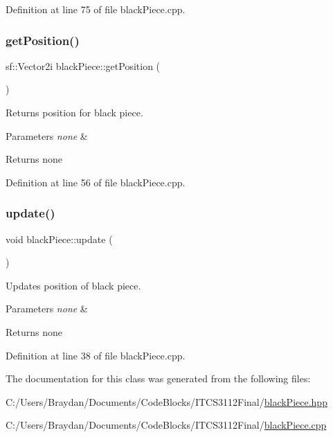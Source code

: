 Definition at line 75 of file black\+Piece.\+cpp.

\mbox{\label{classblack_piece_aba875884346491615e27d4c5111b46a1}} 
\subsubsection{\texorpdfstring{getPosition()}{getPosition()}}
{\footnotesize\ttfamily sf\+::\+Vector2i black\+Piece\+::get\+Position (\begin{DoxyParamCaption}{ }\end{DoxyParamCaption})}

Returns position for black piece.


\begin{DoxyParams}{Parameters}
{\em none} & \\
\hline
\end{DoxyParams}
\begin{DoxyReturn}{Returns}
none 
\end{DoxyReturn}


Definition at line 56 of file black\+Piece.\+cpp.

\mbox{\label{classblack_piece_a8ab322b89affd828b413b3fee35827fa}} 
\subsubsection{\texorpdfstring{update()}{update()}}
{\footnotesize\ttfamily void black\+Piece\+::update (\begin{DoxyParamCaption}{ }\end{DoxyParamCaption})}

Updates position of black piece.


\begin{DoxyParams}{Parameters}
{\em none} & \\
\hline
\end{DoxyParams}
\begin{DoxyReturn}{Returns}
none 
\end{DoxyReturn}


Definition at line 38 of file black\+Piece.\+cpp.



The documentation for this class was generated from the following files\+:\begin{DoxyCompactItemize}
\item 
C\+:/\+Users/\+Braydan/\+Documents/\+Code\+Blocks/\+I\+T\+C\+S3112\+Final/\mbox{\hyperlink{black_piece_8hpp}{black\+Piece.\+hpp}}\item 
C\+:/\+Users/\+Braydan/\+Documents/\+Code\+Blocks/\+I\+T\+C\+S3112\+Final/\mbox{\hyperlink{black_piece_8cpp}{black\+Piece.\+cpp}}\end{DoxyCompactItemize}
